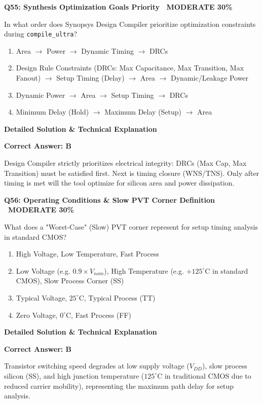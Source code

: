 \documentclass[11pt,a4paper]{article}
\newcommand{\badgemod}{{\color{white}\colorbox{modoran}{\bfseries\sffamily\tiny\ MODERATE 30\%\ }}}
\newenvironment{qbox}[2]{%
  \begin{mdframed}[style=qstyle]%
  {\bfseries\sffamily\color{primaryblue}#1 \hfill #2}\par\vspace{2pt}%
}{%
  \end{mdframed}%
}
\newenvironment{ansbox}{%
  \begin{mdframed}[style=ansstyle]%
  {\bfseries\sffamily\color{ansgreen}\small Detailed Solution \& Technical Explanation}\par\vspace{2pt}\small%
}{%
  \end{mdframed}%
}
\begin{document}
\begin{qbox}{Q55: Synthesis Optimization Goals Priority}{\badgemod}
In what order does Synopsys Design Compiler prioritize optimization constraints during \texttt{compile\_ultra}?
\begin{enumerate}[label=\textbf{\Alph*.}]
  \item Area $\rightarrow$ Power $\rightarrow$ Dynamic Timing $\rightarrow$ DRCs
  \item Design Rule Constraints (DRCs: Max Capacitance, Max Transition, Max Fanout) $\rightarrow$ Setup Timing (Delay) $\rightarrow$ Area $\rightarrow$ Dynamic/Leakage Power
  \item Dynamic Power $\rightarrow$ Area $\rightarrow$ Setup Timing $\rightarrow$ DRCs
  \item Minimum Delay (Hold) $\rightarrow$ Maximum Delay (Setup) $\rightarrow$ Area
\end{enumerate}
\end{qbox}
\begin{ansbox}
\textbf{Correct Answer: B}

Design Compiler strictly prioritizes electrical integrity: DRCs (Max Cap, Max Transition) must be satisfied first. Next is timing closure (WNS/TNS). Only after timing is met will the tool optimize for silicon area and power dissipation.
\end{ansbox}

\begin{qbox}{Q56: Operating Conditions \& Slow PVT Corner Definition}{\badgemod}
What does a "Worst-Case" (Slow) PVT corner represent for setup timing analysis in standard CMOS?
\begin{enumerate}[label=\textbf{\Alph*.}]
  \item High Voltage, Low Temperature, Fast Process
  \item Low Voltage (e.g. $0.9 \times V_{nom}$), High Temperature (e.g. $+125^\circ\text{C}$ in standard CMOS), Slow Process Corner (SS)
  \item Typical Voltage, $25^\circ\text{C}$, Typical Process (TT)
  \item Zero Voltage, $0^\circ\text{C}$, Fast Process (FF)
\end{enumerate}
\end{qbox}
\begin{ansbox}
\textbf{Correct Answer: B}

Transistor switching speed degrades at low supply voltage ($V_{DD}$), slow process silicon (SS), and high junction temperature ($125^\circ\text{C}$ in traditional CMOS due to reduced carrier mobility), representing the maximum path delay for setup analysis.
\end{ansbox}
\end{document}
